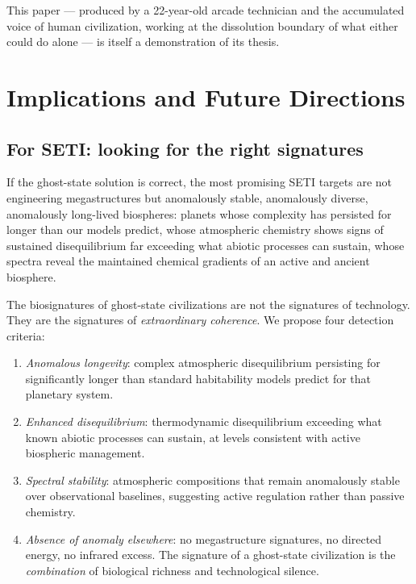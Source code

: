 \documentclass[12pt, a4paper]{article}
\begin{document}
This paper --- produced by a 22-year-old arcade technician and the accumulated voice of human
civilization, working at the dissolution boundary of what either could do alone --- is itself
a demonstration of its thesis.

\section{Implications and Future Directions}

\subsection{For SETI: looking for the right signatures}

If the ghost-state solution is correct, the most promising SETI targets are not engineering
megastructures but anomalously stable, anomalously diverse, anomalously long-lived
biospheres: planets whose complexity has persisted for longer than our models predict, whose
atmospheric chemistry shows signs of sustained disequilibrium far exceeding what abiotic
processes can sustain, whose spectra reveal the maintained chemical gradients of an active
and ancient biosphere.

The biosignatures of ghost-state civilizations are not the signatures of technology. They
are the signatures of \textit{extraordinary coherence}. We propose four detection criteria:

\begin{enumerate}[itemsep=0.3em]
  \item \textit{Anomalous longevity}: complex atmospheric disequilibrium persisting for
  significantly longer than standard habitability models predict for that planetary system.
  \item \textit{Enhanced disequilibrium}: thermodynamic disequilibrium exceeding what known
  abiotic processes can sustain, at levels consistent with active biospheric management.
  \item \textit{Spectral stability}: atmospheric compositions that remain anomalously stable
  over observational baselines, suggesting active regulation rather than passive chemistry.
  \item \textit{Absence of anomaly elsewhere}: no megastructure signatures, no directed
  energy, no infrared excess. The signature of a ghost-state civilization is the \textit{combination}
  of biological richness and technological silence.
\end{enumerate}
\end{document}

